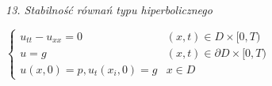 \textit{13. Stabilność równań typu hiperbolicznego}

$\left\{\begin{matrix} u_{tt} - u_{xx} = 0 & (x,t) \in D \times [0,T) \\ u = g & (x,t) \in \partial D \times [0,T) \\ u(x,0) = p, u_t(x_i,0) = g & x \in D \end{matrix}\right.$